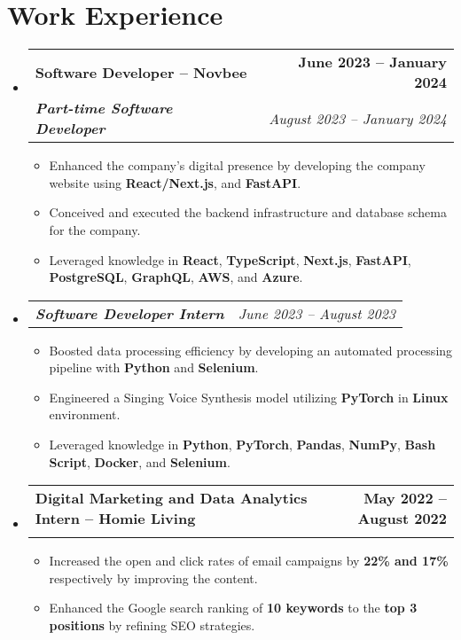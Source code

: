 \documentclass[a4paper,11pt]{article}
\makeatletter
\newcommand{\resumeItem}[1]{
  \item\small{
    {#1 \vspace{-2pt}}
  }
}
\newcommand{\resumeSubheading}[4]{
  \vspace{-2pt}\item
  \begin{tabular*}{1.0\textwidth}[t]{l@{\extracolsep{\fill}}r}
    \textbf{#1} & \textbf{\small #2} \\
    \textit{\small#3} & \textit{\small #4} \\
  \end{tabular*}\vspace{-7pt}
}
\newcommand{\resumeSubSubheading}[2]{
  \item
  \begin{tabular*}{1.0\textwidth}[t]{l@{\extracolsep{\fill}}r}
    \textit{\small#1} & \textit{\small #2} \\
  \end{tabular*}\vspace{-7pt}
}
\newcommand{\resumeProjectHeading}[2]{
  \item
  \begin{tabular*}{1.001\textwidth}{l@{\extracolsep{\fill}}r}
    \textbf{\small#1} & \textbf{\small #2}\\
  \end{tabular*}\vspace{-7pt}
}
\newcommand{\resumeSubHeadingListStart}{\begin{itemize}[leftmargin=0.0in, label={}]}
\newcommand{\resumeSubHeadingListEnd}{\end{itemize}}
\newcommand{\resumeItemListStart}{\begin{itemize}}
\newcommand{\resumeItemListEnd}{\end{itemize}\vspace{-5pt}}
\makeatother
\begin{document}
\section{Work Experience}
\resumeSubHeadingListStart

\resumeSubheading
{Software Developer -- Novbee}{June 2023 -- January 2024}
{\textbf{Part-time Software Developer}}{August 2023 -- January 2024}
\resumeItemListStart
\resumeItem{Enhanced the company's digital presence by developing the company website using \textbf{React/Next.js}, and \textbf{FastAPI}.}
\resumeItem{Conceived and executed the backend infrastructure and database schema for the company.}
\resumeItem{Leveraged knowledge in \textbf{React}, \textbf{TypeScript}, \textbf{Next.js}, \textbf{FastAPI}, \textbf{PostgreSQL}, \textbf{GraphQL}, \textbf{AWS}, and \textbf{Azure}.}
\resumeItemListEnd
\vspace{-4pt}
\resumeSubSubheading{\textbf{Software Developer Intern}}{June 2023 -- August 2023}
\resumeItemListStart
\resumeItem{Boosted data processing efficiency by developing an automated processing pipeline with \textbf{Python} and \textbf{Selenium}.}
\resumeItem{Engineered a Singing Voice Synthesis model utilizing \textbf{PyTorch} in \textbf{Linux} environment.}
\resumeItem{Leveraged knowledge in \textbf{Python}, \textbf{PyTorch}, \textbf{Pandas}, \textbf{NumPy}, \textbf{Bash Script}, \textbf{Docker}, and \textbf{Selenium}.}
\resumeItemListEnd

\resumeSubheading
{Digital Marketing and Data Analytics Intern -- Homie Living}{May 2022 -- August 2022}{}{}\vspace{-18pt}
\resumeItemListStart
\resumeItem{Increased the open and click rates of email campaigns by \textbf{22\% and 17\%} respectively by improving the content.}
\resumeItem{Enhanced the Google search ranking of \textbf{10 keywords} to the \textbf{top 3 positions} by refining SEO strategies.}
\resumeItemListEnd

\resumeSubHeadingListEnd
\vspace{-16pt}


\end{document}
